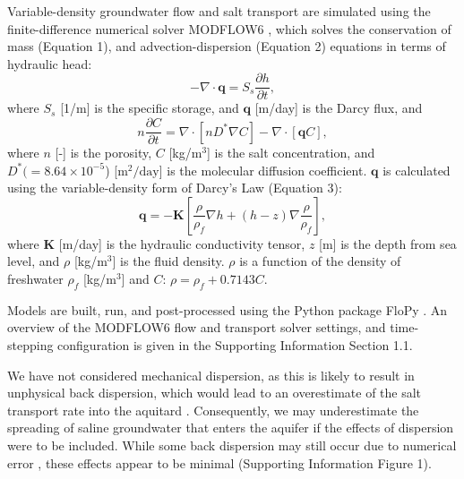 \documentclass[draft, 10pt]{agujournal2019}
\begin{document}
Variable-density groundwater flow and salt transport are simulated using the finite-difference numerical solver MODFLOW6 \cite{langevin_documentation_2017},
which solves the conservation of mass (Equation 1), and advection-dispersion (Equation 2) equations in terms of hydraulic head:
\begin{equation} \label{eq:comhead}
-\nabla \cdot \boldsymbol{q}=S_s\frac{\partial h}{\partial t},
\end{equation}
where $S_s$ [1/m] is the specific storage,  and $\boldsymbol{q}$ [m/day] is the Darcy flux, and
\begin{equation} \label{eq:consconc} 
n\frac{\partial C}{\partial t}=\nabla\cdot\left[nD^{\ast}\nabla C\right]-\nabla \cdot \left[\boldsymbol{q} C \right],
\end{equation}
where $n$ [-] is the porosity,   $C$ [kg/m$^3$] is the salt concentration, and $D^*(=8.64\times10^{-5} $) [$\mathrm{m}^2/\mathrm{day}$] is the molecular diffusion coefficient. $\boldsymbol{q}$ is calculated using the variable-density form of Darcy's Law (Equation 3):
\begin{equation}
\boldsymbol{q} = -\boldsymbol{K}\left[ \frac{\rho}{\rho_f}\nabla h +(h-z)\nabla\frac{\rho}{\rho_f}\right],
\end{equation}
where  $\textbf{K}$ [m/day] is the hydraulic conductivity tensor, $z$ [m] is the depth from sea level,  and $\rho$ [kg/m$^3$] is the fluid density.
$\rho$ is a function of the density of freshwater $\rho_f$ [kg/m$^3$] and  $C$: $\rho = \rho_f + 0.7143C$.

 Models are built, run, and post-processed using the Python package FloPy \cite{bakker_scripting_2016}.
An overview of the MODFLOW6 flow and transport solver settings, and time-stepping configuration is given in the Supporting Information Section 1.1.

We have not considered mechanical dispersion, as this is likely to result in unphysical back dispersion,
which would lead to an overestimate of the salt transport rate into the aquitard \cite{smith_mixed_2004, irvine_upstream_2021}.
Consequently, we may underestimate the spreading of saline groundwater that enters the aquifer if the effects of dispersion were to be included.
While some back dispersion may still occur due to numerical error \cite{woods_numerical_2003}, these effects appear to be minimal (Supporting Information Figure 1).
\end{document}
